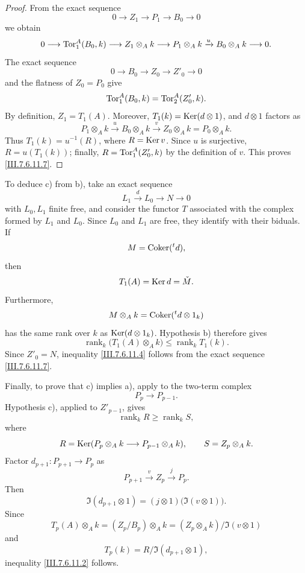 {\begin{remarks}[7.6.11]
\begin{proof}
From the exact sequence
\[
  0\longrightarrow Z_1\longrightarrow P_1
  \longrightarrow B_0\longrightarrow0
\]
we obtain
\[
  0\longrightarrow\operatorname{Tor}_1^A(B_0,k)
  \longrightarrow Z_1\otimes_A k
  \longrightarrow P_1\otimes_A k
  \xrightarrow{u}B_0\otimes_A k
  \longrightarrow0.
\]
The exact sequence
\[
  0\longrightarrow B_0\longrightarrow Z_0
  \longrightarrow Z'_0\longrightarrow0
\]
and the flatness of $Z_0=P_0$ give
\[
  \operatorname{Tor}_1^A(B_0,k)=\operatorname{Tor}_2^A(Z'_0,k).
\]
By definition, $Z_1=T_1(A)$.  Moreover,
$T_1(k)=\operatorname{Ker}(d\otimes1)$, and $d\otimes1$ factors as
\[
  P_1\otimes_A k
  \xrightarrow{u}B_0\otimes_A k
  \xrightarrow{v}Z_0\otimes_A k
  =
  P_0\otimes_A k.
\]
Thus $T_1(k)=u^{-1}(R)$, where $R=\operatorname{Ker} v$.  Since $u$ is
surjective, $R=u(T_1(k))$; finally,
$R=\operatorname{Tor}_1^A(Z'_0,k)$ by the definition of $v$.  This proves
\eqref{III.7.6.11.7}.
\end{proof}

To deduce \textnormal{c)} from \textnormal{b)}, take an exact
sequence
\[
  L_1\xrightarrow{d}L_0\longrightarrow N\longrightarrow0
\]
with $L_0,L_1$ finite free, and consider the functor $T$
associated with the complex formed by $L_1$ and $L_0$.
Since $L_0$ and $L_1$ are free, they identify with their
biduals.  If
\[
  M=\operatorname{Coker}({}^t d),
\]
then
\[
  T_1(A)=\operatorname{Ker} d=\check M.
\]
Furthermore,
\[
  M\otimes_A k=\operatorname{Coker}({}^t d\otimes1_k)
\]
has the same rank over $k$ as $\operatorname{Ker}(d\otimes1_k)$.
Hypothesis \textnormal{b)} therefore gives
\[
  \operatorname{rank}_k\bigl(T_1(A)\otimes_A k\bigr)
  \leq
  \operatorname{rank}_kT_1(k).
\]
Since $Z'_0=N$, inequality \eqref{III.7.6.11.4} follows from
the exact sequence \eqref{III.7.6.11.7}.

Finally, to prove that \textnormal{c)} implies
\textnormal{a)}, apply  to the two-term
complex
\[
  P_p\longrightarrow P_{p-1}.
\]
Hypothesis \textnormal{c)}, applied to $Z'_{p-1}$, gives
\[
  \operatorname{rank}_k R\geq\operatorname{rank}_k S,
\]
where
\[
  R=\operatorname{Ker}(P_p\otimes_A k\longrightarrow P_{p-1}\otimes_A k),
  \qquad
  S=Z_p\otimes_A k.
\]
Factor $d_{p+1}:P_{p+1}\to P_p$ as
\[
  P_{p+1}\xrightarrow{v}Z_p\xrightarrow{j}P_p.
\]
Then
\[
  \Im(d_{p+1}\otimes1)
  =
  (j\otimes1)\bigl(\Im(v\otimes1)\bigr).
\]
Since
\[
  T_p(A)\otimes_A k
  =
  (Z_p/B_p)\otimes_A k
  =
  (Z_p\otimes_A k)/\Im(v\otimes1)
\]
and
\[
  T_p(k)=R/\Im(d_{p+1}\otimes1),
\]
inequality \eqref{III.7.6.11.2} follows.


\end{remarks}}
